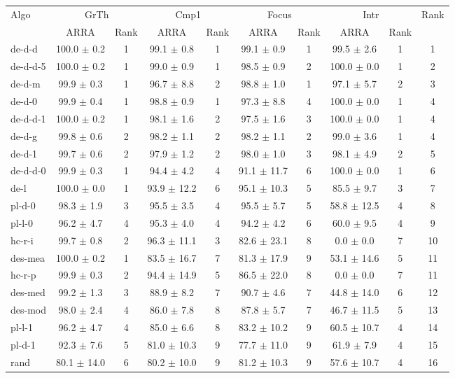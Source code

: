 \begin{tabular}{ l | c c|c c|c c|c c | c }
\multirow{2}{*}{Algo}& \multicolumn{2}{c|}{GrTh} & \multicolumn{2}{c|}{Cmp1} & \multicolumn{2}{c|}{Focus} & \multicolumn{2}{c|}{Intr} & \multirow{2}{*}{Rank}\\\cline{2-9}
& ARRA & Rank & ARRA & Rank & ARRA & Rank & ARRA & Rank  & \\\hline
de-d-d  & 100.0 $\pm$ 0.2 & 1 & 99.1 $\pm$ 0.8 & 1 & 99.1 $\pm$ 0.9 & 1 & 99.5 $\pm$ 2.6 & 1& 1\\\hline
de-d-d-5  & 100.0 $\pm$ 0.2 & 1 & 99.0 $\pm$ 0.9 & 1 & 98.5 $\pm$ 0.9 & 2 & 100.0 $\pm$ 0.0 & 1& 2\\\hline
de-d-m  & 99.9 $\pm$ 0.3 & 1 & 96.7 $\pm$ 8.8 & 2 & 98.8 $\pm$ 1.0 & 1 & 97.1 $\pm$ 5.7 & 2& 3\\\hline
de-d-0  & 99.9 $\pm$ 0.4 & 1 & 98.8 $\pm$ 0.9 & 1 & 97.3 $\pm$ 8.8 & 4 & 100.0 $\pm$ 0.0 & 1& 4\\\hline
de-d-d-1  & 100.0 $\pm$ 0.2 & 1 & 98.1 $\pm$ 1.6 & 2 & 97.5 $\pm$ 1.6 & 3 & 100.0 $\pm$ 0.0 & 1& 4\\\hline
de-d-g  & 99.8 $\pm$ 0.6 & 2 & 98.2 $\pm$ 1.1 & 2 & 98.2 $\pm$ 1.1 & 2 & 99.0 $\pm$ 3.6 & 1& 4\\\hline
de-d-1  & 99.7 $\pm$ 0.6 & 2 & 97.9 $\pm$ 1.2 & 2 & 98.0 $\pm$ 1.0 & 3 & 98.1 $\pm$ 4.9 & 2& 5\\\hline
de-d-d-0  & 99.9 $\pm$ 0.3 & 1 & 94.4 $\pm$ 4.2 & 4 & 91.1 $\pm$ 11.7 & 6 & 100.0 $\pm$ 0.0 & 1& 6\\\hline
de-l  & 100.0 $\pm$ 0.0 & 1 & 93.9 $\pm$ 12.2 & 6 & 95.1 $\pm$ 10.3 & 5 & 85.5 $\pm$ 9.7 & 3& 7\\\hline
pl-d-0  & 98.3 $\pm$ 1.9 & 3 & 95.5 $\pm$ 3.5 & 4 & 95.5 $\pm$ 5.7 & 5 & 58.8 $\pm$ 12.5 & 4& 8\\\hline
pl-l-0  & 96.2 $\pm$ 4.7 & 4 & 95.3 $\pm$ 4.0 & 4 & 94.2 $\pm$ 4.2 & 6 & 60.0 $\pm$ 9.5 & 4& 9\\\hline
hc-r-i  & 99.7 $\pm$ 0.8 & 2 & 96.3 $\pm$ 11.1 & 3 & 82.6 $\pm$ 23.1 & 8 & 0.0 $\pm$ 0.0 & 7& 10\\\hline
des-mea  & 100.0 $\pm$ 0.2 & 1 & 83.5 $\pm$ 16.7 & 7 & 81.3 $\pm$ 17.9 & 9 & 53.1 $\pm$ 14.6 & 5& 11\\\hline
hc-r-p  & 99.9 $\pm$ 0.3 & 2 & 94.4 $\pm$ 14.9 & 5 & 86.5 $\pm$ 22.0 & 8 & 0.0 $\pm$ 0.0 & 7& 11\\\hline
des-med  & 99.2 $\pm$ 1.3 & 3 & 88.9 $\pm$ 8.2 & 7 & 90.7 $\pm$ 4.6 & 7 & 44.8 $\pm$ 14.0 & 6& 12\\\hline
des-mod  & 98.0 $\pm$ 2.4 & 4 & 86.0 $\pm$ 7.8 & 8 & 87.8 $\pm$ 5.7 & 7 & 46.7 $\pm$ 11.5 & 5& 13\\\hline
pl-l-1  & 96.2 $\pm$ 4.7 & 4 & 85.0 $\pm$ 6.6 & 8 & 83.2 $\pm$ 10.2 & 9 & 60.5 $\pm$ 10.7 & 4& 14\\\hline
pl-d-1  & 92.3 $\pm$ 7.6 & 5 & 81.0 $\pm$ 10.3 & 9 & 77.7 $\pm$ 11.0 & 9 & 61.9 $\pm$ 7.9 & 4& 15\\\hline
rand  & 80.1 $\pm$ 14.0 & 6 & 80.2 $\pm$ 10.0 & 9 & 81.2 $\pm$ 10.3 & 9 & 57.6 $\pm$ 10.7 & 4& 16
\end{tabular}
